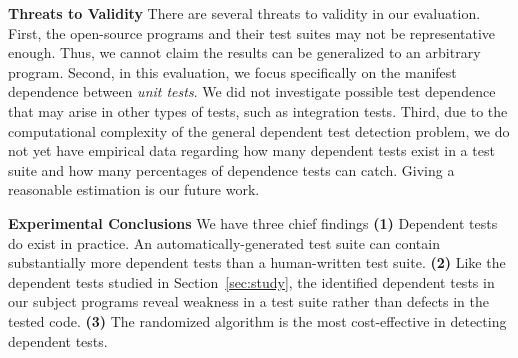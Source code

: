 
\vspace{1mm}
\noindent \textbf{Threats to Validity}
There are several threats to validity in our evaluation.
First, the \subjnum open-source
programs and their test suites may not be
representative enough. Thus, we cannot claim the results
can be generalized to an arbitrary program.
Second, in this evaluation, we focus specifically on
the {manifest dependence} between \textit{unit tests}.
We did not investigate possible test dependence that may arise
in other types of tests, such as integration tests.
Third, due to the computational complexity of the general dependent test
detection problem, we do not yet have
empirical data regarding how many dependent
tests exist in a test suite and how many percentages of dependence tests
\ourtool can catch.  Giving a reasonable estimation is our future work.


\vspace{1mm}

\noindent \textbf{Experimental Conclusions}
We have three chief findings \textbf{(1)}
Dependent tests do exist in practice.
An automatically-generated test suite can contain
substantially more dependent tests than a human-written
test suite.
\textbf{(2)} Like the dependent tests
studied in Section~\ref{sec:study}, the identified
dependent tests in our subject programs reveal weakness
in a test suite rather than defects in the tested code.
\textbf{(3)} 
The randomized algorithm is the
most cost-effective in detecting dependent tests.


